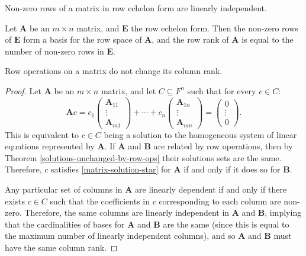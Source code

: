 \documentclass[12pt]{article}
\begin{document}
\begin{lemma}
    Non-zero rows of a matrix in row echelon form are linearly independent.
\end{lemma}

\begin{cor}
    Let $\boldsymbol{A}$ be an $m \times n$ matrix, and $\boldsymbol{E}$ the row echelon form. Then the non-zero rows of $\boldsymbol{E}$ form a basis for the row space of $\boldsymbol{A}$, and the row rank of $\boldsymbol{A}$ is equal to the number of non-zero rows in $\boldsymbol{E}$.
\end{cor}

\begin{lemma}\label{row-ops-column-rank}
    Row operations on a matrix do not change its column rank.
\end{lemma}

\begin{proof}
    Let $\boldsymbol{A}$ be an $m \times n$ matrix, and let $C \subseteq F^n$ such that for every $c \in C$:
    \begin{equation}\label{matrix-solution-star}\tag{$\star$}
        \boldsymbol{A}c = c_1\begin{pmatrix} \boldsymbol{A}_{11} \\ \vdots \\ \boldsymbol{A}_{m1} \end{pmatrix} + \cdots + c_n\begin{pmatrix} \boldsymbol{A}_{1n} \\ \vdots \\ \boldsymbol{A}_{mn} \end{pmatrix} = \begin{pmatrix} 0 \\ \vdots \\ 0 \end{pmatrix}.
    \end{equation}
    This is equivalent to $c \in C$ being a solution to the homogeneous system of linear equations represented by $\boldsymbol{A}$. If $\boldsymbol{A}$ and $\boldsymbol{B}$ are related by row operations, then by Theorem \ref{solutions-unchanged-by-row-ops} their solutions sets are the same. Therefore, $c$ satisfies \ref{matrix-solution-star} for $\boldsymbol{A}$ if and only if it does so for $\boldsymbol{B}$.

    Any particular set of columns in $\boldsymbol{A}$ are linearly dependent if and only if there exists $c \in C$ such that the coefficients in $c$ corresponding to each column are non-zero. Therefore, the same columns are linearly independent in $\boldsymbol{A}$ and $\boldsymbol{B}$, implying that the cardinalities of bases for $\boldsymbol{A}$ and $\boldsymbol{B}$ are the same (since this is equal to the maximum number of linearly independent columns), and so $\boldsymbol{A}$ and $\boldsymbol{B}$ must have the same column rank.
\end{proof}
\end{document}
